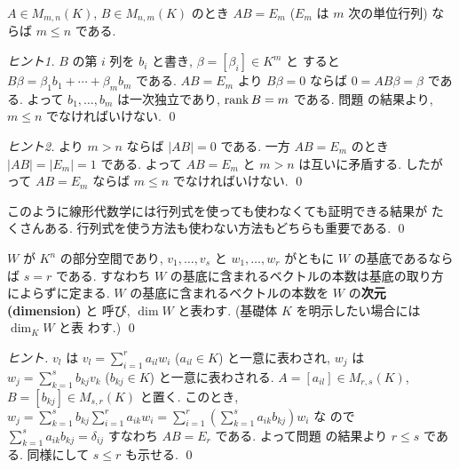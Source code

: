 \documentclass[12pt,twoside]{jarticle}
\begin{document}

\begin{question}
  \label{q:AB=Em}
  $A\in M_{m,n}(K)$, $B\in M_{n,m}(K)$ 
  のとき $AB=E_m$ ($E_m$ は $m$ 次の単位行列) ならば $m\le n$ である.
\end{question}

\begin{proof}[ヒント1]
  $B$ の第 $i$ 列を $b_i$ と書き, $\beta=[\beta_i]\in K^m$ と
  すると $B\beta = \beta_1b_1+\cdots+\beta_mb_m$ である.
  $AB=E_m$ より $B\beta=0$ ならば $0 = AB\beta = \beta$ である.
  よって $b_1,\ldots,b_m$ は一次独立であり, $\mathop{\mathrm{rank}}\nolimits B=m$ である.
  問題  の結果より, $m\le n$ でなければいけない.
  \qed
\end{proof}

\begin{proof}[ヒント2]
   より $m>n$ ならば $|AB|=0$ である.
  一方 $AB=E_m$ のとき $|AB|=|E_m|=1$ である.
  よって $AB=E_m$ と $m>n$ は互いに矛盾する.
  したがって $AB=E_m$ ならば $m\le n$ でなければいけない.
  \qed
\end{proof}

\begin{guide}
  このように線形代数学には行列式を使っても使わなくても証明できる結果が
  たくさんある.  行列式を使う方法も使わない方法もどちらも重要である.
  \qed
\end{guide}


\begin{question}[部分空間の次元]
  \label{q:W-dim}
  $W$ が $K^n$ の部分空間であり, $v_1,\ldots,v_s$ と $w_1,\ldots,w_r$ 
  がともに $W$ の基底であるならば $s=r$ である.
  すなわち $W$ の基底に含まれるベクトルの本数は基底の取り方によらずに定まる.
  $W$ の基底に含まれるベクトルの本数を $W$ の{\bf 次元 (dimension)} と
  呼び, $\dim W$ と表わす.  (基礎体 $K$ を明示したい場合には $\dim_K W$ と表
  わす.) 
  \qed
\end{question}

\begin{proof}[ヒント]
  $v_l$ は $v_l=\sum_{i=1}^r a_{il}w_i$ ($a_{il}\in K$) と一意に表わされ,
  $w_j$ は $w_j=\sum_{k=1}^s b_{kj}v_k$ ($b_{kj}\in K$) と一意に表わされる.
  $A=[a_{il}]\in M_{r,s}(K)$, $B=[b_{kj}]\in M_{s,r}(K)$ と置く.
  このとき, $w_j=\sum_{k=1}^s b_{kj}\sum_{i=1}^r a_{ik}w_i
  = \sum_{i=1}^r \left(\sum_{k=1}^s a_{ik}b_{kj}\right) w_i$ な
  ので $\sum_{k=1}^s a_{ik}b_{kj} = \delta_{ij}$ すなわち $AB=E_r$ である.
  よって問題  の結果より $r\le s$ である.
  同様にして $s\le r$ も示せる.
  \qed
\end{proof}
\end{document}
